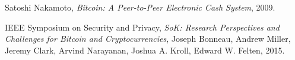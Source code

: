 %
%
%
\begin{thebibliography}{1}

  Satoshi Nakamoto,
  \emph{Bitcoin: A Peer-to-Peer Electronic Cash System},
  2009.



  IEEE Symposium on Security and Privacy,
  \emph{SoK: Research Perspectives and Challenges for Bitcoin and
Cryptocurrencies},
  Joseph Bonneau, Andrew Miller, Jeremy Clark, Arvind Narayanan, Joshua
A. Kroll, Edward W. Felten,
  2015.

\end{thebibliography}

